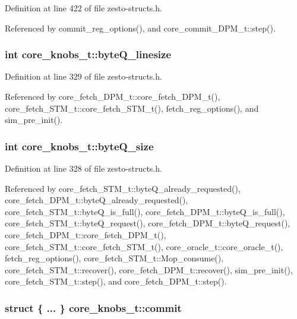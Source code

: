 Definition at line 422 of file zesto-structs.h.

Referenced by commit\_\-reg\_\-options(), and core\_\-commit\_\-DPM\_\-t::step().
\subsubsection[{byteQ\_\-linesize}]{\setlength{\rightskip}{0pt plus 5cm}int {\bf core\_\-knobs\_\-t::byteQ\_\-linesize}}\label{structcore__knobs__t_19d455195aa815b92d55a848fba5cd7e}




Definition at line 329 of file zesto-structs.h.

Referenced by core\_\-fetch\_\-DPM\_\-t::core\_\-fetch\_\-DPM\_\-t(), core\_\-fetch\_\-STM\_\-t::core\_\-fetch\_\-STM\_\-t(), fetch\_\-reg\_\-options(), and sim\_\-pre\_\-init().
\subsubsection[{byteQ\_\-size}]{\setlength{\rightskip}{0pt plus 5cm}int {\bf core\_\-knobs\_\-t::byteQ\_\-size}}\label{structcore__knobs__t_f97a040f494d7b834ea43c3e0f396000}




Definition at line 328 of file zesto-structs.h.

Referenced by core\_\-fetch\_\-STM\_\-t::byteQ\_\-already\_\-requested(), core\_\-fetch\_\-DPM\_\-t::byteQ\_\-already\_\-requested(), core\_\-fetch\_\-STM\_\-t::byteQ\_\-is\_\-full(), core\_\-fetch\_\-DPM\_\-t::byteQ\_\-is\_\-full(), core\_\-fetch\_\-STM\_\-t::byteQ\_\-request(), core\_\-fetch\_\-DPM\_\-t::byteQ\_\-request(), core\_\-fetch\_\-DPM\_\-t::core\_\-fetch\_\-DPM\_\-t(), core\_\-fetch\_\-STM\_\-t::core\_\-fetch\_\-STM\_\-t(), core\_\-oracle\_\-t::core\_\-oracle\_\-t(), fetch\_\-reg\_\-options(), core\_\-fetch\_\-STM\_\-t::Mop\_\-consume(), core\_\-fetch\_\-STM\_\-t::recover(), core\_\-fetch\_\-DPM\_\-t::recover(), sim\_\-pre\_\-init(), core\_\-fetch\_\-STM\_\-t::step(), and core\_\-fetch\_\-DPM\_\-t::step().
\subsubsection[{commit}]{\setlength{\rightskip}{0pt plus 5cm}struct \{ ... \}   {\bf core\_\-knobs\_\-t::commit}}\label{structcore__knobs__t_2b7876a4f411b3ae2041c14a7cae699e}




